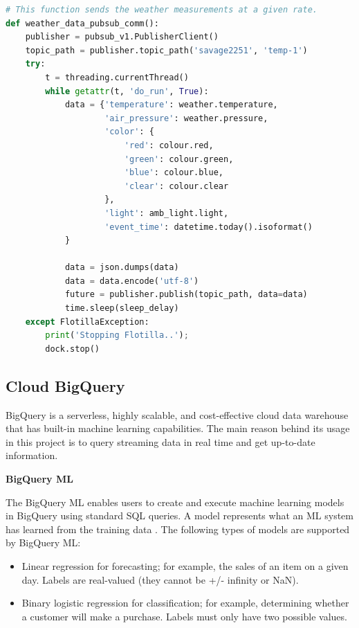 \begin{lstlisting}[language=Python, caption=Python example Pub/Sub]
# This function sends the weather measurements at a given rate. 
def weather_data_pubsub_comm():
    publisher = pubsub_v1.PublisherClient()
    topic_path = publisher.topic_path('savage2251', 'temp-1')
    try:
        t = threading.currentThread()
        while getattr(t, 'do_run', True):
            data = {'temperature': weather.temperature,
                    'air_pressure': weather.pressure,
                    'color': {
                        'red': colour.red, 
                        'green': colour.green, 
                        'blue': colour.blue, 
                        'clear': colour.clear
                    },
                    'light': amb_light.light,
                    'event_time': datetime.today().isoformat()
            }

            data = json.dumps(data)
            data = data.encode('utf-8')
            future = publisher.publish(topic_path, data=data)
            time.sleep(sleep_delay)
    except FlotillaException:
        print('Stopping Flotilla..'); 
        dock.stop()
\end{lstlisting}

\subsection{Cloud BigQuery}

BigQuery is a serverless, highly scalable, and cost-effective cloud data warehouse that has built-in machine learning capabilities. The main reason behind its usage in this project is to query streaming data in real time and get up-to-date information.

\vspace{0.4cm}
\textbf{BigQuery ML}
\vspace{0.4cm}

The BigQuery ML enables users to create and execute machine learning models in BigQuery using standard SQL queries. A model represents what an ML system has learned from the training data \cite{bigQuery}. The following types of models are supported by BigQuery ML:
\begin{itemize}
    \item{Linear regression for forecasting; for example, the sales of an item on a given day. Labels are real-valued (they cannot be +/- infinity or NaN).}
    \item{Binary logistic regression for classification; for example, determining whether a customer will make a purchase. Labels must only have two possible values.}
\end{itemize}

